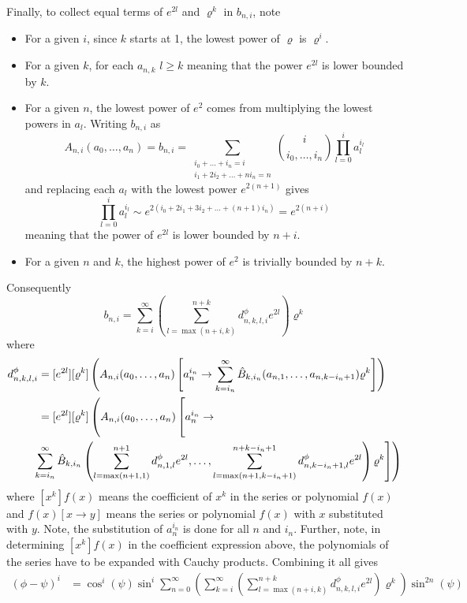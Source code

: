 \documentclass[a4paper]{amsart}
\begin{document}
Finally, to collect equal terms of $e^{2l}$ and $\varrho^{k}$ in $b_{n,i}$, note
\begin{itemize}
\item For a given $i$, since $k$ starts at 1, the lowest power of $\varrho$ is $\varrho^i$.
\item For a given $k$, for each $a_{n,k}$ $l\geq k$ meaning that the power $e^{2l}$ is lower bounded by $k$.
\item For a given $n$, the lowest power of $e^2$ comes from multiplying the lowest powers in $a_l$. Writing $b_{n,i}$ as
\begin{equation*}
A_{n,i}(a_0,\dots,a_n)=b_{n,i}=\sum_{\substack{i_0+\dots+i_n=i \\ i_1+2i_2+\dots+ni_n=n}}\binom{i}{i_0,\dots,i_n}\prod_{l=0}^{i}a_l^{i_l}
\end{equation*}
and replacing each $a_l$ with the lowest power $e^{2(n+1)}$ gives
\begin{equation*}
\prod_{l=0}^{i}a_l^{i_l}\sim e^{2(i_0 + 2i_1+3i_2 + \dots+(n+1)i_n)}=e^{2(n+i)}
\end{equation*}
meaning that the power of $e^{2l}$ is lower bounded by $n+i$. %
\item For a given $n$ and $k$, the highest power of $e^2$ is trivially bounded by $n+k$.
\end{itemize}
Consequently
\begin{equation*}
b_{n,i} = \sum_{k=i}^\infty\left(\sum_{l=\max(n+i,k)}^{n+k} d^\phi_{n,k,l,i}e^{2l}\right)\varrho^k
\end{equation*}
where
\begin{align*}
d^\phi_{n,k,l,i}&=[e^{2l}][\varrho^k]\left(A_ {n,i}(a_0,\dots,a_n)\left[a_n^{i_n}\rightarrow\sum_{k=i_n}^\infty \hat{B}_{k,i_n}(a_{n,1},\dots,a_{n,k-i_n+1})\varrho^k\right]\right)\\
&=[e^{2l}][\varrho^k]\left(\rule{0cm}{7mm}A_ {n,i}(a_0,\dots,a_n)\left[\rule{0cm}{7mm}a_n^{i_n}\rightarrow\right.\right.\\
&\!\!\!\!\left.\left.\sum_{k=i_n}^\infty \hat{B}_{k,i_n}\left(\sum_{l=\max(n+1,1)}^{n+1} d^\phi_{n,1,l} e^{2l},\dots,\sum_{l=\max(n+1,k-i_n+1)}^{n+k-i_n+1} d^\phi_{n,k-i_n+1,l} e^{2l}\right)\varrho^k\right]\right)
\end{align*}
where $[x^k]f(x)$ means the coefficient of $x^k$ in the series or polynomial $f(x)$ and $f(x)[x\rightarrow y]$ means the series or polynomial $f(x)$ with $x$ substituted with $y$. Note, the substitution of $a_n^{i_n}$ is done for all $n$ and $i_n$. Further, note, in determining $[x^k]f(x)$ in the coefficient expression above, the polynomials of the series have to be expanded with Cauchy products. %
%
Combining it all gives
\begin{align}\label{eq:phiDiffPow}
(\phi-\psi)^i
 &=\cos^i(\psi)\sin^i\sum_{n=0}^\infty \left(\sum_{k=i}^\infty\left(\sum_{l=\max(n+i,k)}^{n+k} d^\phi_{n,k,l,i}e^{2l}\right)\varrho^k\right)\sin^{2n}(\psi)
\end{align}
\end{document}
